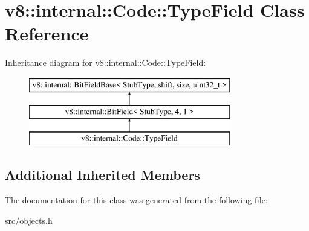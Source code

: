 \hypertarget{classv8_1_1internal_1_1_code_1_1_type_field}{}\section{v8\+:\+:internal\+:\+:Code\+:\+:Type\+Field Class Reference}
\label{classv8_1_1internal_1_1_code_1_1_type_field}
Inheritance diagram for v8\+:\+:internal\+:\+:Code\+:\+:Type\+Field\+:\begin{figure}[H]
\begin{center}
\leavevmode
\includegraphics[height=3.000000cm]{classv8_1_1internal_1_1_code_1_1_type_field}
\end{center}
\end{figure}
\subsection*{Additional Inherited Members}


The documentation for this class was generated from the following file\+:\begin{DoxyCompactItemize}
\item 
src/objects.\+h\end{DoxyCompactItemize}
